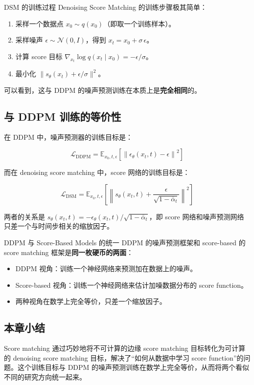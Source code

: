 \begin{knowledgebox}{DSM 的训练过程}
Denoising Score Matching 的训练步骤极其简单：
\begin{enumerate}
    \item 采样一个数据点 $x_0 \sim q(x_0)$（即取一个训练样本）。
    \item 采样噪声 $\epsilon \sim \mathcal{N}(0, I)$，得到 $x_t = x_0 + \sigma\, \epsilon$。
    \item 计算 score 目标 $\nabla_{x_t} \log q(x_t \mid x_0) = -\epsilon / \sigma$。
    \item 最小化 $\|s_\theta(x_t) + \epsilon/\sigma\|^2$。
\end{enumerate}
可以看到，这与 DDPM 的噪声预测训练在本质上是\textbf{完全相同}的。
\end{knowledgebox}

\subsection{与 DDPM 训练的等价性}

在 DDPM 中，噪声预测器的训练目标是：

$$\mathcal{L}_{\text{DDPM}} = \mathbb{E}_{x_0, t, \epsilon}\left[\left\| \epsilon_\theta(x_t, t) - \epsilon \right\|^2\right]$$

而在 denoising score matching 中，score 网络的训练目标是：

$$\mathcal{L}_{\text{DSM}} = \mathbb{E}_{x_0, t, \epsilon}\left[\left\| s_\theta(x_t, t) + \frac{\epsilon}{\sqrt{1-\bar{\alpha}_t}} \right\|^2\right]$$

两者的关系是 $s_\theta(x_t, t) = -\epsilon_\theta(x_t, t) / \sqrt{1-\bar{\alpha}_t}$，即 score 网络和噪声预测网络只差一个与时间步相关的缩放因子。

\begin{importantbox}{DDPM 与 Score-Based Models 的统一}
DDPM 的噪声预测框架和 score-based 的 score matching 框架是\textbf{同一枚硬币的两面}：
\begin{itemize}
    \item DDPM 视角：训练一个神经网络来预测加在数据上的噪声。
    \item Score-based 视角：训练一个神经网络来估计加噪数据分布的 score function。
    \item 两种视角在数学上完全等价，只差一个缩放因子。
\end{itemize}
\end{importantbox}

\subsection{本章小结}

Score matching 通过巧妙地将不可计算的边缘 score matching 目标转化为可计算的 denoising score matching 目标，解决了``如何从数据中学习 score function''的问题。这个训练目标与 DDPM 的噪声预测训练在数学上完全等价，从而将两个看似不同的研究方向统一起来。

